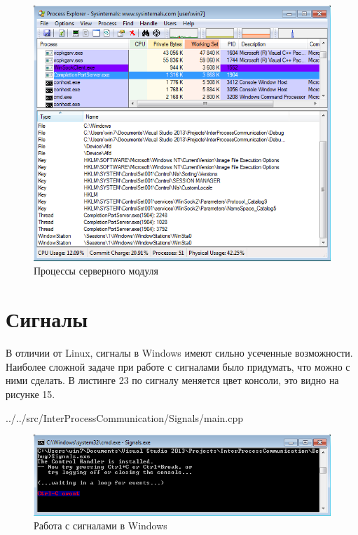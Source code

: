 \documentclass[a4paper, 12pt]{report}		%
\begin{document}
\begin{figure}[h!]
\centering
\includegraphics[scale=0.7]{res/13_Process_Explorer}
\caption{Процессы серверного модуля}
\end{figure}

\chapter*{Сигналы}

В отличии от Linux, сигналы в Windows имеют сильно усеченные возможности. Наиболее сложной задаче при работе с сигналами было придумать, что можно с ними сделать. В листинге 23 по сигналу меняется цвет консоли, это видно на рисунке 15.


{../../src/InterProcessCommunication/Signals/main.cpp}
\vspace{1em}

\begin{figure}[h!]
\centering
\includegraphics[scale=0.95]{res/14_Signals}
\caption{Работа с сигналами в Windows}
\end{figure}
\end{document}
